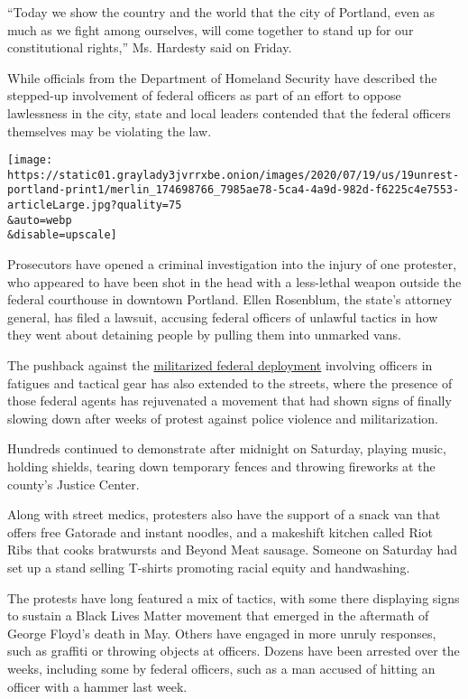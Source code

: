 ``Today we show the country and the world that the city of Portland,
even as much as we fight among ourselves, will come together to stand up
for our constitutional rights,'' Ms. Hardesty said on Friday.

While officials from the Department of Homeland Security have described
the stepped-up involvement of federal officers as part of an effort to
oppose lawlessness in the city, state and local leaders contended that
the federal officers themselves may be violating the law.

\texttt{[image: https://static01.graylady3jvrrxbe.onion/images/2020/07/19/us/19unrest-portland-print1/merlin\_174698766\_7985ae78-5ca4-4a9d-982d-f6225c4e7553-articleLarge.jpg?quality=75\\\&auto=webp\\\&disable=upscale]}

Prosecutors have opened a criminal investigation into the injury of one
protester, who appeared to have been shot in the head with a less-lethal
weapon outside the federal courthouse in downtown Portland. Ellen
Rosenblum, the state's attorney general, has filed a lawsuit, accusing
federal officers of unlawful tactics in how they went about detaining
people by pulling them into unmarked vans.

The pushback against the
\href{https://www.nytimes3xbfgragh.onion/2020/07/17/us/portland-protests.html}{militarized
federal deployment} involving officers in fatigues and tactical gear has
also extended to the streets, where the presence of those federal agents
has rejuvenated a movement that had shown signs of finally slowing down
after weeks of protest against police violence and militarization.

Hundreds continued to demonstrate after midnight on Saturday, playing
music, holding shields, tearing down temporary fences and throwing
fireworks at the county's Justice Center.

Along with street medics, protesters also have the support of a snack
van that offers free Gatorade and instant noodles, and a makeshift
kitchen called Riot Ribs that cooks bratwursts and Beyond Meat sausage.
Someone on Saturday had set up a stand selling T-shirts promoting racial
equity and handwashing.

The protests have long featured a mix of tactics, with some there
displaying signs to sustain a Black Lives Matter movement that emerged
in the aftermath of George Floyd's death in May. Others have engaged in
more unruly responses, such as graffiti or throwing objects at officers.
Dozens have been arrested over the weeks, including some by federal
officers, such as a man accused of hitting an officer with a hammer last
week.

